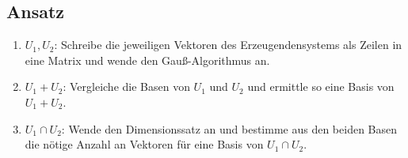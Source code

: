 \subsection{Ansatz}
\begin{enumerate}
	\item \( U_1, U_2 \): Schreibe die jeweiligen Vektoren des Erzeugendensystems als Zeilen in eine Matrix und wende den Gauß-Algorithmus an.
	\item \( U_1 + U_2 \): Vergleiche die Basen von \( U_1 \) und \( U_2 \) und ermittle so eine Basis von \( U_1 + U_2 \).
	\item \( U_1 \cap U_2 \): Wende den Dimensionssatz an und bestimme aus den beiden Basen die nötige Anzahl an Vektoren für eine Basis von \( U_1 \cap U_2 \). 
\end{enumerate}

